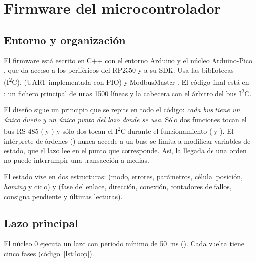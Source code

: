 \chapter{Firmware del microcontrolador}
\label{chap:firmware}

\section{Entorno y organización}

El firmware está escrito en C++ con el entorno Arduino y el núcleo Arduino-Pico \cite{arduinopico},
que da acceso a los periféricos del RP2350 y a su SDK. Usa las bibliotecas 
(I\textsuperscript{2}C),  (UART implementada con PIO) y ModbusMaster
\cite{modbusmaster}. El código final está en : un fichero principal
de unas 1500 líneas y la cabecera  con el árbitro del bus I\textsuperscript{2}C.

El diseño sigue un principio que se repite en todo el código: \emph{cada bus tiene un único dueño y
un único punto del lazo donde se usa}. Sólo dos funciones tocan el bus RS-485
( y ) y sólo dos tocan el I\textsuperscript{2}C durante el
funcionamiento ( y ). El intérprete de órdenes
() nunca accede a un bus: se limita a modificar variables de estado, que el
lazo lee en el punto que corresponde. Así, la llegada de una orden no puede interrumpir una
transacción a medias.

El estado vive en dos estructuras:  (modo, errores, parámetros, célula,
posición, \emph{homing} y ciclo) y  (fase del enlace, dirección, conexión,
contadores de fallos, consigna pendiente y últimas lecturas).

\section{Lazo principal}
\label{sec:fw-lazo}

El núcleo 0 ejecuta un lazo con periodo mínimo de \SI{50}{\milli\second} (). Cada
vuelta tiene cinco fases (código~\ref{lst:loop}).

